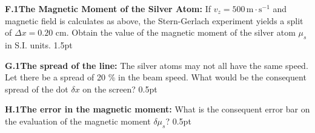 \textbf{F.1}\quad \textbf{The Magnetic Moment of the Silver Atom:} If
$v_z = 500\,\mathrm{m{\cdot}s^{-1}}$ and magnetic field is calculates as
above, the Stern-Gerlach experiment yields a split of $\Delta x = 0.20$ cm.
Obtain the value of the magnetic moment of the silver atom $\mu_s$ in S.I.
units. \hfill 1.5pt

\textbf{G.1}\quad \textbf{The spread of the line:} The silver atoms may not
all have the same speed. Let there be a spread of 20 \% in the beam speed.
What would be the consequent spread of the dot $\delta x$ on the screen?
\hfill 0.5pt

\textbf{H.1}\quad \textbf{The error in the magnetic moment:} What is the
consequent error bar on the evaluation of the magnetic moment $\delta\mu_s$?
\hfill 0.5pt
